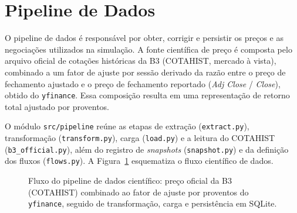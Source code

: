 \documentclass{eic-bcc-tcc}
\begin{document}
\section{Pipeline de Dados}

O pipeline de dados é responsável por obter, corrigir e persistir os preços e as negociações utilizados na simulação. A fonte científica de preço é composta pelo arquivo oficial de cotações históricas da B3 (COTAHIST, mercado à vista), combinado a um fator de ajuste por sessão derivado da razão entre o preço de fechamento ajustado e o preço de fechamento reportado (\textit{Adj Close} / \textit{Close}), obtido do \texttt{yfinance}. Essa composição resulta em uma representação de retorno total ajustado por proventos.

O módulo \texttt{src/pipeline} reúne as etapas de extração (\texttt{extract.py}), transformação (\texttt{transform.py}), carga (\texttt{load.py}) e a leitura do COTAHIST (\texttt{b3\_official.py}), além do registro de \textit{snapshots} (\texttt{snapshot.py}) e da definição dos fluxos (\texttt{flows.py}). A Figura~\ref{fig:pipeline} esquematiza o fluxo científico de dados.

\begin{figure}[htbp]
\centering
{}
\caption{Fluxo do pipeline de dados científico: preço oficial da B3 (COTAHIST) combinado ao fator de ajuste por proventos do \texttt{yfinance}, seguido de transformação, carga e persistência em SQLite.}
\label{fig:pipeline}
\end{figure}
\end{document}
